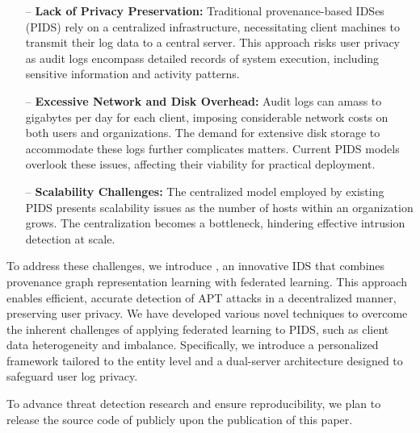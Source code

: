 \begin{itemize} [leftmargin=*]
    \item[--] \textbf{Lack of Privacy Preservation:} Traditional provenance-based IDSes (PIDS)  rely on a centralized infrastructure, necessitating client machines to transmit their log data to a central server.  This approach risks user privacy as audit logs encompass detailed records of system execution, including sensitive information and activity patterns.
    
    \item[--] \textbf{Excessive Network and Disk Overhead:} Audit logs can amass to gigabytes per day for each client, imposing considerable network costs on both users and organizations. The demand for extensive disk storage to accommodate these logs further complicates matters. Current PIDS models overlook these issues, affecting their viability for practical deployment.  
    
    \item[--] \textbf{Scalability Challenges:} The centralized model employed by existing PIDS presents scalability issues as the number of hosts within an organization grows. The centralization becomes a bottleneck, hindering effective intrusion detection at scale. 
\end{itemize}

To address these challenges, we introduce \Sys, an innovative IDS that combines provenance graph representation learning with federated learning. This approach enables efficient, accurate detection of APT attacks in a decentralized manner, preserving user privacy. We have developed various novel techniques to overcome the inherent challenges of applying federated learning to PIDS, such as client data heterogeneity and imbalance. Specifically, we introduce a personalized \gnnshort framework tailored to the entity level and a dual-server architecture designed to safeguard user log privacy.









 To advance threat detection research and ensure reproducibility, we plan to release the source code of \Sys publicly upon the publication of this paper.